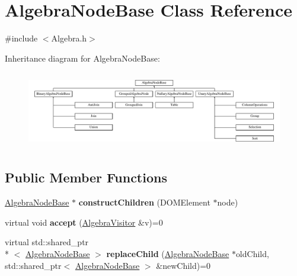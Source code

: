 \hypertarget{class_algebra_node_base}{\section{Algebra\+Node\+Base Class Reference}
\label{class_algebra_node_base}
}


{\ttfamily \#include $<$Algebra.\+h$>$}

Inheritance diagram for Algebra\+Node\+Base\+:\begin{figure}[H]
\begin{center}
\leavevmode
\includegraphics[height=3.414634cm]{class_algebra_node_base}
\end{center}
\end{figure}
\subsection*{Public Member Functions}
\begin{DoxyCompactItemize}
\item 
\hypertarget{class_algebra_node_base_a19f93dd9f8b3da0a216a37f2ceb61ebe}{\hyperlink{class_algebra_node_base}{Algebra\+Node\+Base} $\ast$ {\bfseries construct\+Children} (D\+O\+M\+Element $\ast$node)}\label{class_algebra_node_base_a19f93dd9f8b3da0a216a37f2ceb61ebe}

\item 
\hypertarget{class_algebra_node_base_a33bee3ec6fe1eb4228c0471c95c90d66}{virtual void {\bfseries accept} (\hyperlink{class_algebra_visitor}{Algebra\+Visitor} \&v)=0}\label{class_algebra_node_base_a33bee3ec6fe1eb4228c0471c95c90d66}

\item 
\hypertarget{class_algebra_node_base_aa9bdd02b0ddf793bda18bd146ccacb0d}{virtual std\+::shared\+\_\+ptr\\*
$<$ \hyperlink{class_algebra_node_base}{Algebra\+Node\+Base} $>$ {\bfseries replace\+Child} (\hyperlink{class_algebra_node_base}{Algebra\+Node\+Base} $\ast$old\+Child, std\+::shared\+\_\+ptr$<$ \hyperlink{class_algebra_node_base}{Algebra\+Node\+Base} $>$ \&new\+Child)=0}\label{class_algebra_node_base_aa9bdd02b0ddf793bda18bd146ccacb0d}

\end{DoxyCompactItemize}
